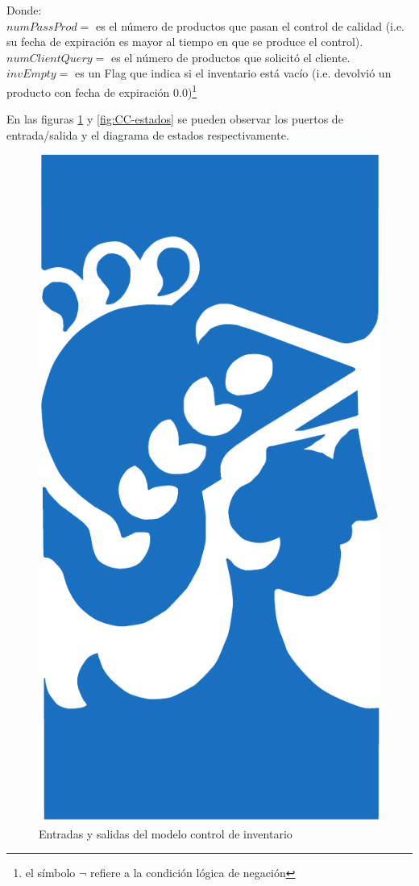 \documentclass[10pt]{article}
\begin{document}
Donde:\\
$numPassProd = $ es el número de productos que pasan el control de calidad (i.e. su fecha de expiración es mayor al tiempo en que se produce el control).\\
$numClientQuery = $ es el número de productos que solicitó el cliente.\\
$invEmpty = $ es un Flag que indica si el inventario está vacío (i.e. devolvió un producto con fecha de expiración $0.0$)\footnote{el símbolo $\neg$ refiere a la condición lógica de negación}

En las figuras \ref{fig:CC-esquematico} y \ref{fig:CC-estados} se pueden observar los puertos de entrada/salida y el diagrama de estados respectivamente.

\begin{figure}[htbp]
	\centering
	\includegraphics{img/fiuba}
	\caption{Entradas y salidas del modelo control de inventario}
	\label{fig:CC-esquematico}
\end{figure}
\end{document}
